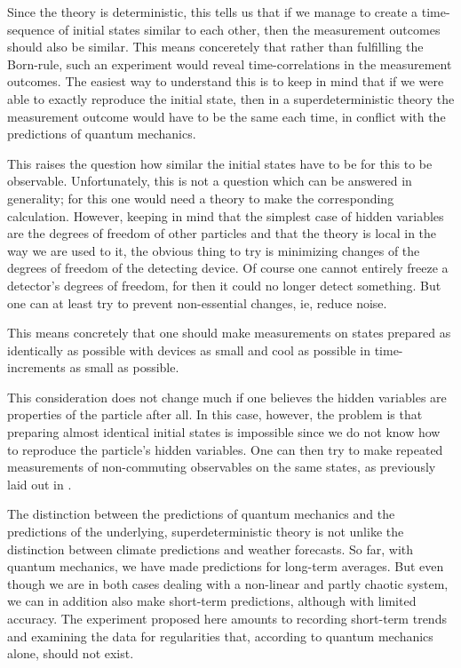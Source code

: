 \documentclass[12pt]{article}
\begin{document}
Since the theory is deterministic, this tells us that if we manage to create a time-sequence of initial states similar to each other, then the measurement outcomes should also be similar. This means conceretely that rather than fulfilling the Born-rule, such an experiment would reveal time-correlations in the measurement outcomes. The easiest way to understand this is to keep in mind that if we were able to exactly reproduce the initial state, then in a superdeterministic theory the measurement outcome would have to be the same each time, in conflict with the predictions of quantum mechanics. 

This raises the question how similar the initial states have to be for this to be observable. Unfortunately, this is not a question which can be answered in generality; for this one would need a theory  to make the corresponding calculation. However, keeping in mind that the simplest case of hidden variables are the degrees of freedom of other particles and that the theory is local in the way we are used to it, the obvious thing to try is minimizing changes of the degrees of freedom of the detecting device. Of course one cannot entirely freeze a detector's degrees of freedom, for then it could no longer detect something. But one can at least try to prevent non-essential changes, ie, reduce noise.

This means concretely that one should make measurements on states prepared as identically as possible with devices as small and cool as possible in time-increments as small as possible. 

This consideration does not change much if one believes the hidden variables are properties of the particle after all. In this case, however, the problem is that preparing almost identical initial states is impossible since we do not know how to reproduce the particle's hidden variables. One can then try to make repeated measurements of non-commuting observables on the same states, as previously laid out in \cite{Hossenfelder:2011ct}. 

The distinction between the predictions of quantum mechanics and the predictions of the underlying, superdeterministic theory is not unlike the distinction between climate predictions and weather forecasts. So far, with quantum mechanics, we have made predictions for long-term averages. But even though we are in both cases dealing with a non-linear and partly chaotic system, we can in addition also make short-term predictions, although with limited accuracy. The experiment proposed here amounts to recording short-term trends and examining the data for regularities that, according to quantum mechanics alone, should not exist. 
\end{document}
